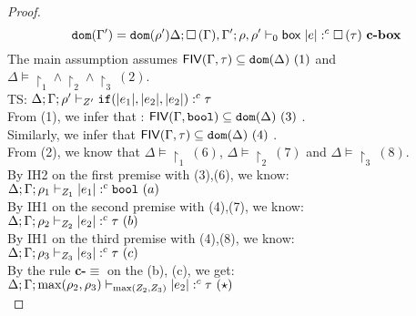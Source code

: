 \begin{proof}
\[{        \mathtt{dom}(\Gamma')= \mathtt{dom}(\rho')
    }
    {
        \Delta; \mathtt{\square} \, (\Gamma), \Gamma'; \rho, \rho' \vdash_{ 0} { \mathsf{box} \; |e|} :^c  \mathtt{\square} \, (\tau)
    } ~\textbf{c-box}
     \]
%
The main assumption assumes $\mathsf{FIV} ( \Gamma, \tau)  \subseteq  \mathtt{dom}(\Delta) ~(1)$ and $\Delta \models \restriction_1 \land \restriction_2 \land \restriction_3 ~(2)$.\\
TS: $ \Delta; \Gamma; \rho' \vdash_{ Z'} {\mathtt{if} (|e_1|, |e_2|, |e_2|) } :^c  \tau  $\\
From (1), we infer that : $\mathsf{FIV} ( \Gamma, \mathtt{bool})  \subseteq  \mathtt{dom}(\Delta)~(3)$ .\\
%
Similarly, we infer that  $\mathsf{FIV} ( \Gamma, \tau)  \subseteq  \mathtt{dom}(\Delta)~(4)$ . \\
From (2), we know that $\Delta \models \restriction_1~(6)$, $\Delta \models \restriction_2~(7)$ and $\Delta \models \restriction_3~(8)$.\\
By IH2 on the first premise with (3),(6), we know:\\
$   \Delta;\Gamma; \rho_1 \vdash_{ Z_1} { |e_1| } :^c  \mathtt{bool}~(a) $\\
By IH1 on the second premise with (4),(7), we know:\\
$   \Delta;\Gamma; \rho_2 \vdash_{ Z_2} { |e_2| } :^c  \tau~(b) $\\
By IH1 on the third premise with (4),(8), we know:\\
$   \Delta;\Gamma; \rho_3 \vdash_{ Z_3} { |e_3| } :^c  \tau~(c) $\\
By the rule \textbf{c-$\equiv$} on the (b), (c), we get: \\
$   \Delta;\Gamma; \max(\rho_2,\rho_3) \vdash_{ \max(Z_2,Z_3)} { |e_2| } :^c  \tau~(\star) $\\

\end{proof}
